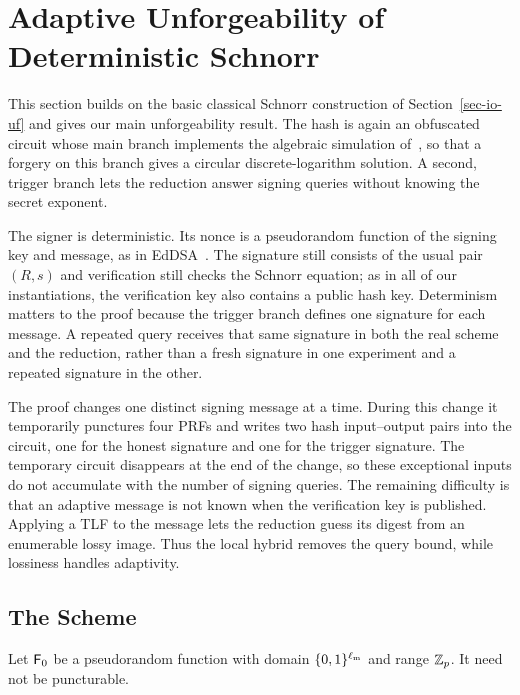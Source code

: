 \section{Adaptive Unforgeability of Deterministic Schnorr} \label{sec-derand}

This section builds on the basic classical Schnorr construction of Section~\ref{sec-io-uf} and gives our main unforgeability result. The hash is again an obfuscated circuit whose main branch implements the algebraic simulation of~\cite{C:CFOS25}, so that a forgery on this branch gives a circular discrete-logarithm solution. A second, trigger branch lets the reduction answer signing queries without knowing the secret exponent.

The signer is deterministic. Its nonce is a pseudorandom function of the signing key and message, as in EdDSA~\cite{eddsa}. The signature still consists of the usual pair $(R,s)$ and verification still checks the Schnorr equation; as in all of our instantiations, the verification key also contains a public hash key. Determinism matters to the proof because the trigger branch defines one signature for each message. A repeated query receives that same signature in both the real scheme and the reduction, rather than a fresh signature in one experiment and a repeated signature in the other.

The proof changes one distinct signing message at a time. During this change it temporarily punctures four PRFs and writes two hash input--output pairs into the circuit, one for the honest signature and one for the trigger signature. The temporary circuit disappears at the end of the change, so these exceptional inputs do not accumulate with the number of signing queries. The remaining difficulty is that an adaptive message is not known when the verification key is published. Applying a TLF to the message lets the reduction guess its digest from an enumerable lossy image. Thus the local hybrid removes the query bound, while lossiness handles adaptivity.

\subsection{The Scheme} \label{sec-derand-scheme}

Let $\mathsf{F}_0$ be a pseudorandom function with domain $\{0,1\}^{\ell_{\mathrm{m}}}$ and range $\mathbb Z_p$. It need not be puncturable.

